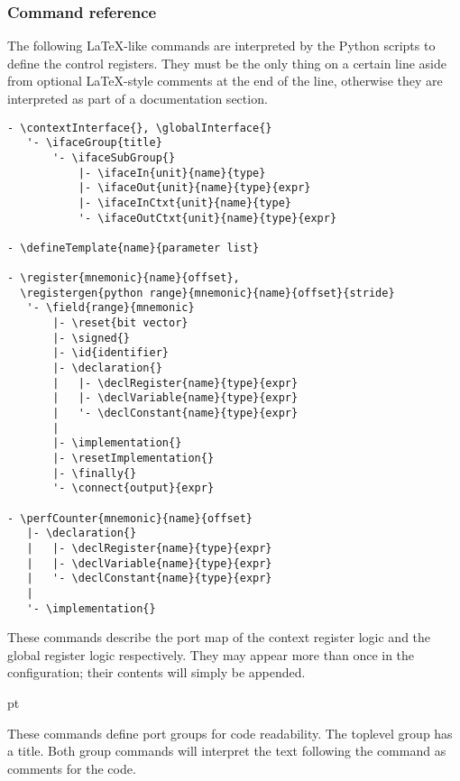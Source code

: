 
\subsubsection{Command reference}
\label{sec:core-ug-cfg-cregs-cref}

The following LaTeX-like commands are interpreted by the Python scripts to 
define the control registers. They must be the only thing on a certain line 
aside from optional LaTeX-style comments at the end of the line, otherwise they 
are interpreted as part of a documentation section.

\begin{lstlisting}[numbers=none, language=nothing]
- \contextInterface{}, \globalInterface{}
   '- \ifaceGroup{title}
       '- \ifaceSubGroup{}
           |- \ifaceIn{unit}{name}{type}
           |- \ifaceOut{unit}{name}{type}{expr}
           |- \ifaceInCtxt{unit}{name}{type}
           '- \ifaceOutCtxt{unit}{name}{type}{expr}
           
- \defineTemplate{name}{parameter list}

- \register{mnemonic}{name}{offset},
  \registergen{python range}{mnemonic}{name}{offset}{stride}
   '- \field{range}{mnemonic}
       |- \reset{bit vector}
       |- \signed{}
       |- \id{identifier}
       |- \declaration{}
       |   |- \declRegister{name}{type}{expr}
       |   |- \declVariable{name}{type}{expr}
       |   '- \declConstant{name}{type}{expr}
       |
       |- \implementation{}
       |- \resetImplementation{}
       |- \finally{}
       '- \connect{output}{expr}
       
- \perfCounter{mnemonic}{name}{offset}
   |- \declaration{}
   |   |- \declRegister{name}{type}{expr}
   |   |- \declVariable{name}{type}{expr}
   |   '- \declConstant{name}{type}{expr}
   |
   '- \implementation{}
\end{lstlisting}


\codehead{\contextInterface{}}

\codehead{\globalInterface{}}

\noindent These commands describe the port map of the context register logic and 
the global register logic respectively. They may appear more than once in the 
configuration; their contents will simply be appended.

 pt

\codehead{\ifaceSubGroup{}}

\noindent These commands define port groups for code readability. The toplevel 
group has a title. Both group commands will interpret the text following the 
command as comments for the code.


